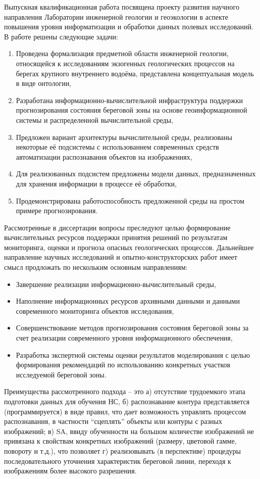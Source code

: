 \documentclass[732,fontsize=14pt,final]{studrep}
\begin{document}
Выпускная квалификационная работа посвящена проекту развития научного направления Лаборатории инженерной геологии и геоэкологии в аспекте повышения уровня информатизации и обработки данных полевых исследований. В работе решены следующие задачи:
\begin{enumerate}
  \item Проведена формализация предметной области инженерной геологии, относящейся к исследованиям экзогенных геологических процессов на берегах крупного внутреннего водоёма, представлена концептуальная модель в виде онтологии,
  \item Разработана информационно-вычислительной инфраструктура поддержки прогнозирования состояния береговой зоны на основе геоинформационной системы и распределенной вычислительной среды,
  \item Предложен вариант архитектуры вычислительной среды,  реализованы некоторые её подсистемы с использованием современных средств автоматизации распознавания объектов на изображениях,
  \item Для реализованных подсистем предложены модели данных, предназначенных для хранения информации в процессе её обработки,
  \item Продемонстрирована работоспособность предложенной среды на простом примере прогнозирования.
\end{enumerate}

Рассмотренные в диссертации вопросы преследуют целью формирование вычислительных ресурсов поддержки принятия решений по результатам мониторинга, оценки и прогноза опасных геологических процессов. Дальнейшее направление научных исследований и опытно-конструкторских работ имеет смысл продложать по нескольким основным направлениям:
\begin{itemize}
  \item Завершение реализации информационно-вычислительный среды,
  \item Наполнение информационных ресурсов архивными данными и данными современного мониторинга объектов исследования,
  \item Совершенствование методов прогнозирования состояния береговой зоны за счет реализации современного уровня информационного обеспечения,
  \item Разработка экспертной системы оценки результатов моделирования с целью формирования рекомендаций по использованию конкретных участков исследуемой береговой зоны.
\end{itemize}

Преимущества рассмотренного подхода -- это а) отсутствие трудоемкого этапа подготовки данных для обучения НС, б) распознавание контура представляется (программируется) в виде правил, что дает возможность управлять процессом распознавания, в частности “сцеплять” объекты или контуры с разных изображений; в) SA, ввиду обученности на большом количестве изображений не привязана к свойствам конкретных изображений (размеру, цветовой гамме, повороту и т.д.), что позволяет г) реализовывать (в перспективе) процедуры последовательного уточнения характеристик береговой линии, переходя к изображениям более высокого разрешения.
\end{document}
